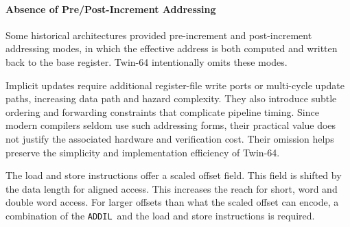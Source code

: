 \paragraph{Absence of Pre/Post-Increment Addressing}

Some historical architectures provided pre-increment and post-increment addressing modes, in which the effective address is both computed and written back to the base register. Twin-64 intentionally omits these modes.

Implicit updates require additional register-file write ports or multi-cycle update paths, increasing data path and hazard complexity. They also introduce subtle ordering and forwarding constraints that complicate pipeline timing. Since modern compilers seldom use such addressing forms, their practical value does not justify the associated hardware and verification cost. Their omission helps preserve the simplicity and implementation efficiency of Twin-64.



The load and store instructions offer a scaled offset field. This field is shifted by the data length for aligned access. This increases the reach for short, word and double word access. For larger offsets than what the scaled offset can encode, a combination of the \texttt{ADDIL} and the load and store instructions is required.

